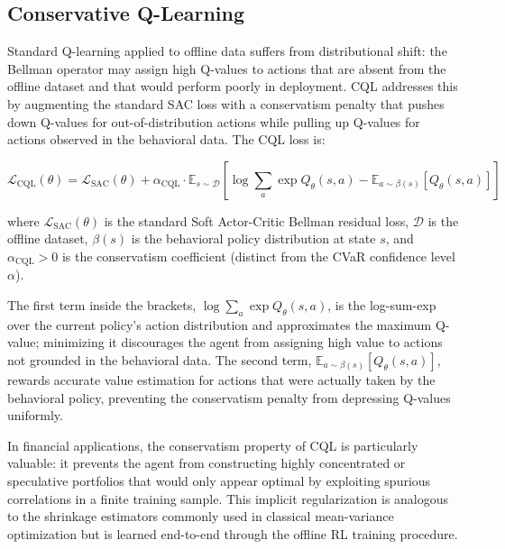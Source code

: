 \subsection{Conservative Q-Learning}
\label{subsec:cql}

Standard Q-learning applied to offline data suffers from distributional shift:
the Bellman operator may assign high Q-values to actions that are absent from
the offline dataset and that would perform poorly in deployment.
CQL \citep{Kumar2020} addresses this by augmenting the standard SAC loss with a
conservatism penalty that pushes down Q-values for out-of-distribution
actions while pulling up Q-values for actions observed in the behavioral data.
The CQL loss is:

\begin{equation}
  \mathcal{L}_{\text{CQL}}(\theta) = \mathcal{L}_{\text{SAC}}(\theta)
  + \alpha_{\text{CQL}} \cdot \mathbb{E}_{s \sim \mathcal{D}}\!\left[
    \log \sum_{a} \exp Q_\theta(s, a)
    - \mathbb{E}_{a \sim \beta(s)}\!\left[ Q_\theta(s, a) \right]
  \right]
  \label{eq:cql_loss}
\end{equation}

where $\mathcal{L}_{\text{SAC}}(\theta)$ is the standard Soft Actor-Critic
Bellman residual loss, $\mathcal{D}$ is the offline dataset,
$\beta(s)$ is the behavioral policy distribution at state $s$,
and $\alpha_{\text{CQL}} > 0$ is the conservatism coefficient
(distinct from the CVaR confidence level $\alpha$).

The first term inside the brackets,
$\log \sum_a \exp Q_\theta(s, a)$, is the log-sum-exp over the current policy's
action distribution and approximates the maximum Q-value; minimizing it
discourages the agent from assigning high value to actions not grounded in the
behavioral data.
The second term, $\mathbb{E}_{a \sim \beta(s)}[Q_\theta(s, a)]$, rewards
accurate value estimation for actions that were actually taken by the behavioral
policy, preventing the conservatism penalty from depressing Q-values uniformly.

In financial applications, the conservatism property of CQL is particularly
valuable: it prevents the agent from constructing highly concentrated or
speculative portfolios that would only appear optimal by exploiting spurious
correlations in a finite training sample.
This implicit regularization is analogous to the shrinkage estimators commonly
used in classical mean-variance optimization but is learned end-to-end
through the offline RL training procedure.

